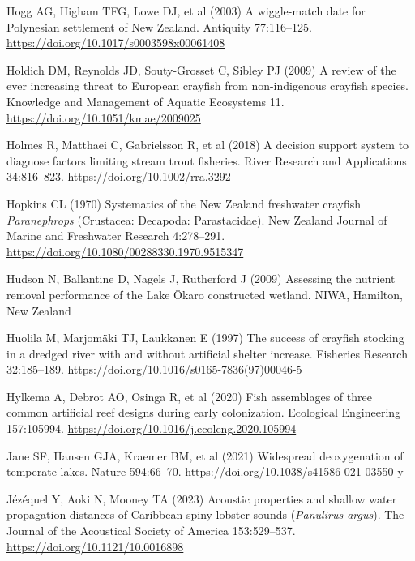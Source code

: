 \documentclass[
  12pt,
  a4paper,
  oneside]{scrbook}
\newlength{\cslhangindent}
\newenvironment{CSLReferences}[2] %
 {\begin{list}{}{%
  \setlength{\itemindent}{0pt}
  \setlength{\leftmargin}{0pt}
  \setlength{\parsep}{0pt}
  \ifodd #1
   \setlength{\leftmargin}{\cslhangindent}
   \setlength{\itemindent}{-1\cslhangindent}
  \fi
  \setlength{\itemsep}{#2\baselineskip}}}
 {\end{list}}
\renewenvironment{CSLReferences}[2]
   {\begin{list}{}{%
    \setlength{\itemindent}{0pt}
    \setlength{\leftmargin}{0pt}
    \setlength{\parsep}{0pt}
    \ifodd #1
     \setlength{\leftmargin}{\cslhangindent}
     \setlength{\itemindent}{-1\cslhangindent}
    \fi
    \setlength{\itemsep}{0.3\baselineskip}}}
   {\end{list}}%
\begin{document}
\begin{CSLReferences}{1}{1}
Hogg AG, Higham TFG, Lowe DJ, et al (2003) A wiggle-match date for
{Polynesian} settlement of {New Zealand}. Antiquity 77:116--125.
\url{https://doi.org/10.1017/s0003598x00061408}

Holdich DM, Reynolds JD, Souty-Grosset C, Sibley PJ (2009) A review of
the ever increasing threat to {European} crayfish from non-indigenous
crayfish species. Knowledge and Management of Aquatic Ecosystems 11.
\url{https://doi.org/10.1051/kmae/2009025}

Holmes R, Matthaei C, Gabrielsson R, et al (2018) A decision support
system to diagnose factors limiting stream trout fisheries. River
Research and Applications 34:816--823.
\url{https://doi.org/10.1002/rra.3292}

Hopkins CL (1970) Systematics of the {New Zealand} freshwater crayfish
{\emph{Paranephrops}} ({Crustacea}: {Decapoda}: {Parastacidae}). New
Zealand Journal of Marine and Freshwater Research 4:278--291.
\url{https://doi.org/10.1080/00288330.1970.9515347}

Hudson N, Ballantine D, Nagels J, Rutherford J (2009) Assessing the
nutrient removal performance of the {Lake Ōkaro} constructed wetland.
NIWA, Hamilton, New Zealand

Huolila M, Marjomäki TJ, Laukkanen E (1997) The success of crayfish
stocking in a dredged river with and without artificial shelter
increase. Fisheries Research 32:185--189.
\url{https://doi.org/10.1016/s0165-7836(97)00046-5}

Hylkema A, Debrot AO, Osinga R, et al (2020) Fish assemblages of three
common artificial reef designs during early colonization. Ecological
Engineering 157:105994.
\url{https://doi.org/10.1016/j.ecoleng.2020.105994}

{Jane SF, Hansen GJA, Kraemer BM, et al} (2021) Widespread deoxygenation
of temperate lakes. Nature 594:66--70.
\url{https://doi.org/10.1038/s41586-021-03550-y}

Jézéquel Y, Aoki N, Mooney TA (2023) Acoustic properties and shallow
water propagation distances of {Caribbean} spiny lobster sounds
({\emph{Panulirus argus}}). The Journal of the Acoustical Society of
America 153:529--537. \url{https://doi.org/10.1121/10.0016898}


\end{CSLReferences}
\end{document}
